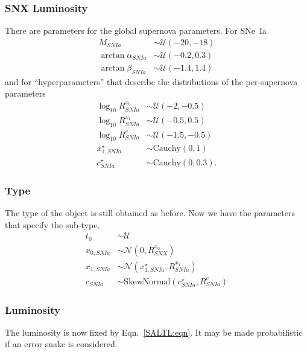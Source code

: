 \documentclass[preprint,3p]{elsarticle}
\begin{document}
\subsubsection{SNX Luminosity}
There are parameters for the global supernova parameters.  For SNe~Ia
\begin{align}
M_{SNIa} & \sim \mathcal{U}(-20, -18) \\
\arctan{\alpha_{SNIa}} & \sim \mathcal{U}(-0.2, 0.3) \\
\arctan{\beta_{SNIa}} & \sim \mathcal{U}(-1.4, 1.4)
\end{align}
and for ``hyperparameters'' that describe the distributions of the per-supernova parameters
\begin{align}
\log_{10}{R^{x_0}_{SNIa}} & \sim \mathcal{U}({-2}, {-0.5})\\
\log_{10}{R^{x_1}_{SNIa}} & \sim \mathcal{U}({-0.5}, {0.5})\\
\log_{10}{R^{c}_{SNIa}} & \sim \mathcal{U}({-1.5}, {-0.5})\\
x_{1,SNIa}^\star& \sim \text{Cauchy}(0,1)\\
c^\star_{SNIa} & \sim \text{Cauchy}(0,0.3).
\end{align}


\subsubsection{Type}
The type of the object is still obtained as before.  Now we have the parameters that specify the sub-type.
\begin{align}
t_0 & \sim \mathcal{U}\\
x_{0, SNIa} & \sim \mathcal{N}(0,R^{x_0}_{SNX})\\
x_{1,SNIa} & \sim \mathcal{N}(x_{1,SNIa}^\star,R^{x_1}_{SNIa})\\
c_{SNIa} & \sim \text{SkewNormal}(c^\star_{SNIa},R^{c}_{SNIa} )
\end{align}

\subsubsection{Luminosity}
The luminosity is now fixed by Eqn.\ \ref{SALTL:eqn}.  It may be made probabilistic if an error snake is considered.
\end{document}
